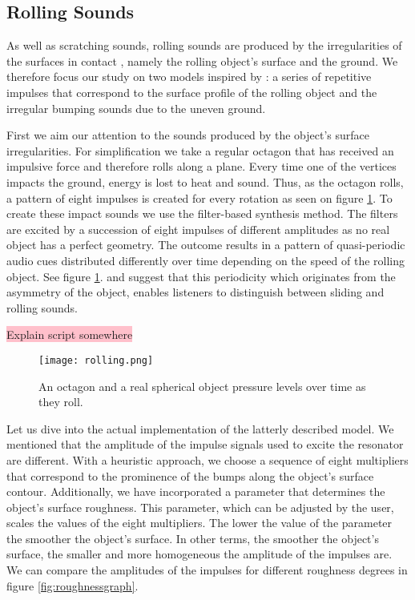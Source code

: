 \subsection{Rolling Sounds}\label{sec:rolling_synth}

As well as scratching sounds, rolling sounds are produced by the irregularities of the surfaces in contact \cite{van2001foleyautomatic}, namely the rolling object's surface and the ground. We therefore focus our study on two models inspired by \cite{farnell2010designing}: a series of repetitive impulses that correspond to the surface profile of the rolling object and the irregular bumping sounds due to the uneven ground.

First we aim our attention to the sounds produced by the object's surface irregularities. For simplification we take a regular octagon that has received an impulsive force and therefore rolls along a plane. Every time one of the vertices impacts the ground, energy is lost to heat and sound. Thus, as the octagon rolls, a pattern of eight impulses is created for every rotation as seen on figure \ref{fig:rolling}. To create these impact sounds we use the filter-based synthesis method. The filters are excited by a succession of eight impulses of different amplitudes as no real object has a perfect geometry. The outcome results in a pattern of quasi-periodic audio cues distributed differently over time depending on the speed of the rolling object. See figure \ref{fig:rolling}. \cite{houben1999auditory} and \cite{rath2003expressive} suggest that this periodicity which originates from the asymmetry of the object, enables listeners to distinguish between sliding and rolling sounds.

\colorbox{pink}{Explain script somewhere}

\begin{figure}[H]
  \centering
    \texttt{[image: rolling.png]}
      \caption{An octagon and a real spherical object pressure levels over time as they roll.}
      \label{fig:rolling}
\end{figure} 

Let us dive into the actual implementation of the latterly described model. We mentioned that the amplitude of the impulse signals used to excite the resonator are different. With a heuristic approach, we choose a sequence of eight multipliers that correspond to the prominence of the bumps along the object's surface contour. Additionally, we have incorporated a parameter that determines the object's surface roughness. This parameter, which can be adjusted by the user, scales the values of the eight multipliers. The lower the value of the parameter the smoother the object's surface. In other terms, the smoother the object's surface, the smaller and more homogeneous the amplitude of the impulses are. We can compare the amplitudes of the impulses for different roughness degrees in figure  \ref{fig:roughnessgraph}.


